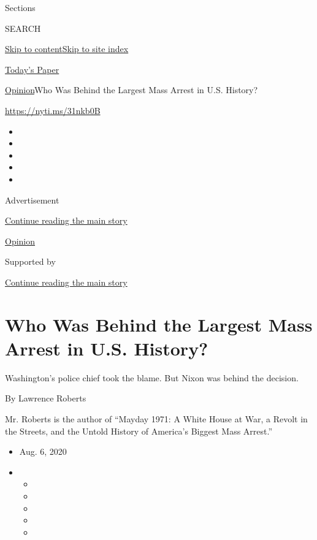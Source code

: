 Sections

SEARCH

\protect\hyperlink{site-content}{Skip to
content}\protect\hyperlink{site-index}{Skip to site index}

\href{https://myaccount.nytimes.com/auth/login?response_type=cookie\&client_id=vi}{}

\href{https://www.nytimes.com/section/todayspaper}{Today's Paper}

\href{/section/opinion}{Opinion}\textbar{}Who Was Behind the Largest
Mass Arrest in U.S. History?

\href{https://nyti.ms/31nkb0B}{https://nyti.ms/31nkb0B}

\begin{itemize}
\item
\item
\item
\item
\item
\end{itemize}

Advertisement

\protect\hyperlink{after-top}{Continue reading the main story}

\href{/section/opinion}{Opinion}

Supported by

\protect\hyperlink{after-sponsor}{Continue reading the main story}

\hypertarget{who-was-behind-the-largest-mass-arrest-in-us-history}{%
\section{Who Was Behind the Largest Mass Arrest in U.S.
History?}\label{who-was-behind-the-largest-mass-arrest-in-us-history}}

Washington's police chief took the blame. But Nixon was behind the
decision.

By Lawrence Roberts

Mr. Roberts is the author of ``Mayday 1971: A White House at War, a
Revolt in the Streets, and the Untold History of America's Biggest Mass
Arrest.''

\begin{itemize}
\item
  Aug. 6, 2020
\item
  \begin{itemize}
  \item
  \item
  \item
  \item
  \item
  \end{itemize}
\end{itemize}

